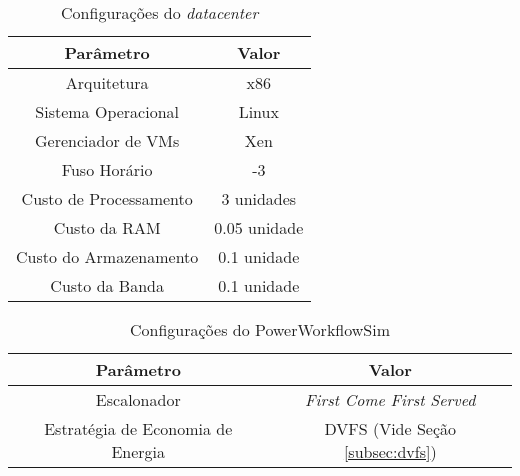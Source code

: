 
\begin{savenotes}
\begin{table}
	\centering
    \begin{tabular}{|c|c|}
    \hline
    \textbf{Parâmetro}     & \textbf{Valor}     \\ \hline
    Arquitetura            & x86          \\
    Sistema Operacional    & Linux        \\
    Gerenciador de VMs     & Xen          \\
    Fuso Horário           & -3           \\
    Custo de Processamento & 3 unidades\footnotemark[2]   \\
    Custo da RAM           & 0.05 unidade\footnotemark[2]  \\
    Custo do Armazenamento & 0.1 unidade\footnotemark[2]  \\
    Custo da Banda         & 0.1 unidade\footnotemark[2]  \\ \hline
    \end{tabular}
    \caption {Configurações do \emph{datacenter}}
    \label{tab:configuracao_datacenter}
\end{table}
\end{savenotes}


\begin{table}
	\centering
    \begin{tabular}{|c|c|}
    \hline
    \textbf{Parâmetro}                & \textbf{Valor}     \\ \hline
    Escalonador                       & \emph{First Come First Served}    \\
    Estratégia de Economia de Energia & DVFS (Vide Seção \ref{subsec:dvfs}) \\ \hline
    \end{tabular}
    \caption {Configurações do PowerWorkflowSim}
    \label{tab:configuracao_powerworkflowsim}
\end{table}


